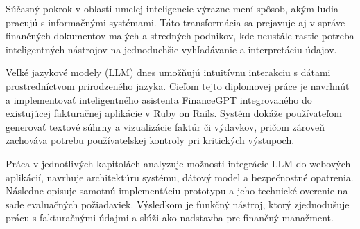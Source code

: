 Súčasný pokrok v oblasti umelej inteligencie výrazne mení spôsob, akým ľudia pracujú
s informačnými systémami. Táto transformácia sa prejavuje aj v správe finančných
dokumentov malých a stredných podnikov, kde neustále rastie potreba inteligentných
nástrojov na jednoduchšie vyhľadávanie a interpretáciu údajov.

Veľké jazykové modely (LLM) dnes umožňujú intuitívnu interakciu s dátami prostredníctvom
prirodzeného jazyka. Cieľom tejto diplomovej práce je navrhnúť a implementovať
inteligentného asistenta FinanceGPT integrovaného do existujúcej fakturačnej
aplikácie v Ruby on Rails. Systém dokáže používateľom generovať textové súhrny a vizualizácie
faktúr či výdavkov, pričom zároveň zachováva potrebu používateľskej kontroly pri
kritických výstupoch.

Práca v jednotlivých kapitolách analyzuje možnosti integrácie LLM do webových
aplikácií, navrhuje architektúru systému, dátový model a bezpečnostné opatrenia. Následne
opisuje samotnú implementáciu prototypu a jeho technické overenie na sade evaluačných
požiadaviek. Výsledkom je funkčný nástroj, ktorý zjednodušuje prácu s fakturačnými
údajmi a slúži ako nadstavba pre finančný manažment.